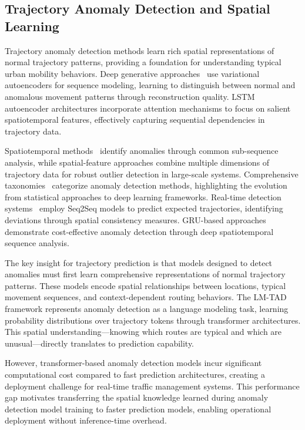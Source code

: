 \subsection{Trajectory Anomaly Detection and Spatial Learning}
\label{sec:lit-anomaly-spatial}

Trajectory anomaly detection methods learn rich spatial representations of normal trajectory patterns, providing a foundation for understanding typical urban mobility behaviors. Deep generative approaches~\cite{liuOnlineAnomalousTrajectory2020} use variational autoencoders for sequence modeling, learning to distinguish between normal and anomalous movement patterns through reconstruction quality. LSTM autoencoder architectures incorporate attention mechanisms to focus on salient spatiotemporal features, effectively capturing sequential dependencies in trajectory data.

Spatiotemporal methods~\cite{heSpatiotemporalTrajectoryAnomaly2022} identify anomalies through common sub-sequence analysis, while spatial-feature approaches combine multiple dimensions of trajectory data for robust outlier detection in large-scale systems. Comprehensive taxonomies~\cite{kongMobileTrajectoryAnomaly2024} categorize anomaly detection methods, highlighting the evolution from statistical approaches to deep learning frameworks. Real-time detection systems~\cite{huRealtimeTaxiSpatial2024} employ Seq2Seq models to predict expected trajectories, identifying deviations through spatial consistency measures. GRU-based approaches~\cite{tangLowcostHighperformanceAbnormal2024} demonstrate cost-effective anomaly detection through deep spatiotemporal sequence analysis.

The key insight for trajectory prediction is that models designed to detect anomalies must first learn comprehensive representations of normal trajectory patterns. These models encode spatial relationships between locations, typical movement sequences, and context-dependent routing behaviors. The LM-TAD framework represents anomaly detection as a language modeling task, learning probability distributions over trajectory tokens through transformer architectures. This spatial understanding—knowing which routes are typical and which are unusual—directly translates to prediction capability.

However, transformer-based anomaly detection models incur significant computational cost compared to fast prediction architectures, creating a deployment challenge for real-time traffic management systems. This performance gap motivates transferring the spatial knowledge learned during anomaly detection model training to faster prediction models, enabling operational deployment without inference-time overhead.

